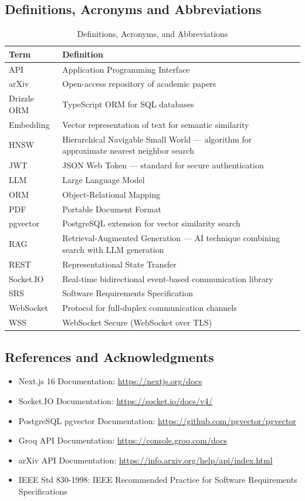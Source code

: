 \documentclass[11pt,a4paper]{article}
\begin{document}
\subsection{Definitions, Acronyms and Abbreviations}

\begin{table}[H]
\centering
\begin{tabular}{p{3cm}p{10cm}}
\toprule
\textbf{Term} & \textbf{Definition} \\
\midrule
API & Application Programming Interface \\
arXiv & Open-access repository of academic papers \\
Drizzle ORM & TypeScript ORM for SQL databases \\
Embedding & Vector representation of text for semantic similarity \\
HNSW & Hierarchical Navigable Small World --- algorithm for approximate nearest neighbor search \\
JWT & JSON Web Token --- standard for secure authentication \\
LLM & Large Language Model \\
ORM & Object-Relational Mapping \\
PDF & Portable Document Format \\
pgvector & PostgreSQL extension for vector similarity search \\
RAG & Retrieval-Augmented Generation --- AI technique combining search with LLM generation \\
REST & Representational State Transfer \\
Socket.IO & Real-time bidirectional event-based communication library \\
SRS & Software Requirements Specification \\
WebSocket & Protocol for full-duplex communication channels \\
WSS & WebSocket Secure (WebSocket over TLS) \\
\bottomrule
\end{tabular}
\caption{Definitions, Acronyms, and Abbreviations}
\end{table}

\subsection{References and Acknowledgments}

\begin{itemize}
    \item Next.js 16 Documentation: \url{https://nextjs.org/docs}
    \item Socket.IO Documentation: \url{https://socket.io/docs/v4/}
    \item PostgreSQL pgvector Documentation: \url{https://github.com/pgvector/pgvector}
    \item Groq API Documentation: \url{https://console.groq.com/docs}
    \item arXiv API Documentation: \url{https://info.arxiv.org/help/api/index.html}
    \item IEEE Std 830-1998: IEEE Recommended Practice for Software Requirements Specifications
\end{itemize}
\end{document}
